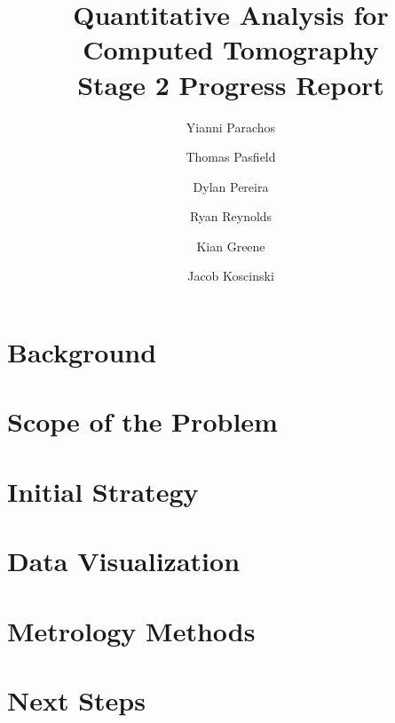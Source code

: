 \documentclass[11pt, letterpaper, notitlepage]{article}
\title{%
  Quantitative Analysis for Computed Tomography\\
  \large \vspace{1em}\textbf{Stage 2 Progress Report}
}
\author{Yianni Parachos}
\author{Thomas Pasfield}
\author{Dylan Pereira}
\author{Ryan Reynolds}
\author{Kian Greene}
\author{Jacob Koscinski}
\affil{Embry-Riddle Aeronautical University, Daytona Beach, FL}
\begin{document}
\maketitle


\begin{multicols}{2}
\section{Background}

\section{Scope of the Problem}

\section{Initial Strategy}

\section{Data Visualization}

\section{Metrology Methods}

\section{Next Steps}

\end{multicols}
\end{document}
